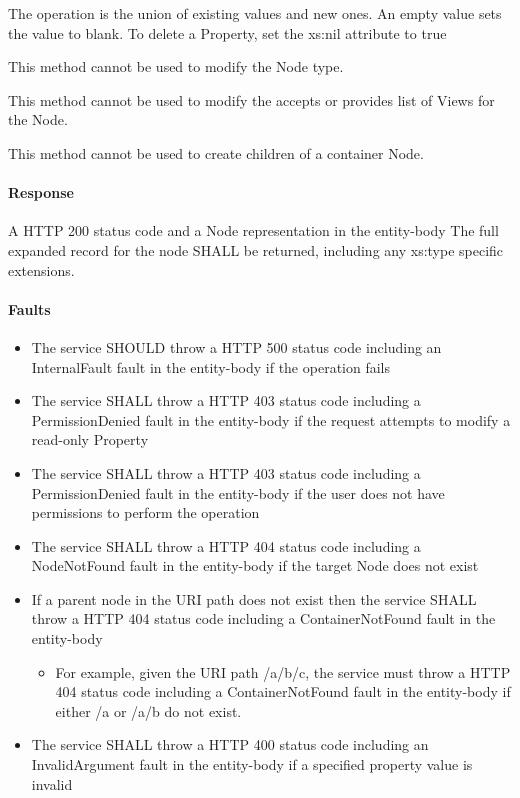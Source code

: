 \documentclass[11pt,a4paper]{ivoa}
\begin{document}
The operation is the union of existing values and new ones.  An empty value sets the value to blank.  To delete a Property, set the xs:nil attribute to true

This method cannot be used to modify the Node type.

This method cannot be used to modify the accepts or provides list of Views for the Node.

This method cannot be used to create children of a container Node.

\paragraph{Response}
A HTTP 200 status code and a Node representation in the entity-body
The full expanded record for the node SHALL be returned, including any xs:type specific extensions.

\paragraph{Faults}
\begin{itemize}
    \item The service SHOULD throw a HTTP 500 status code including an InternalFault fault in the entity-body if the operation fails
    \item The service SHALL throw a HTTP 403 status code including a PermissionDenied fault in the entity-body if the request attempts to modify a read-only Property
    \item The service SHALL throw a HTTP 403 status code including a PermissionDenied fault in the entity-body if the user does not have permissions to perform the operation
    \item The service SHALL throw a HTTP 404 status code including a NodeNotFound fault in the entity-body if the target Node does not exist
    \item If a parent node in the URI path does not exist then the service SHALL throw a HTTP 404 status code including a ContainerNotFound fault in the entity-body
    \begin{itemize}
        \item For example, given the URI path /a/b/c, the service must throw a HTTP 404 status code including a ContainerNotFound fault in the entity-body if either /a or /a/b do not exist.
    \end{itemize}
    \item The service SHALL throw a HTTP 400 status code including an InvalidArgument fault in the entity-body if a specified property value is invalid
\end{itemize}
\end{document}
